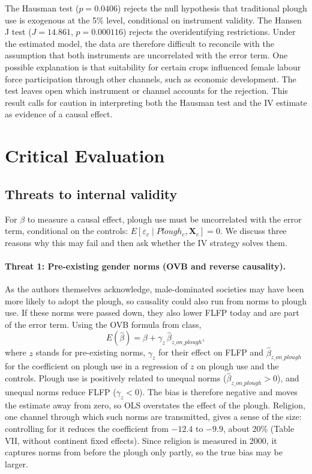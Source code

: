 \documentclass[12pt,a4paper]{article}
\begin{document}
The Hausman test ($p=0.0406$) rejects the null hypothesis that traditional plough use is exogenous at the 5\% level, conditional on instrument validity. The Hansen J test ($J=14.861$, $p=0.000116$) rejects the overidentifying restrictions. Under the estimated model, the data are therefore difficult to reconcile with the assumption that both instruments are uncorrelated with the error term. One possible explanation is that suitability for certain crops influenced female labour force participation through other channels, such as economic development. The test leaves open which instrument or channel accounts for the rejection. This result calls for caution in interpreting both the Hausman test and the IV estimate as evidence of a causal effect.

\section{Critical Evaluation}
\subsection{Threats to internal validity}

For $\beta$ to measure a causal effect, plough use must be uncorrelated with the error term, conditional on the controls: $E[\varepsilon_c \mid Plough_c, \mathbf{X}_c] = 0$. We discuss three reasons why this may fail and then ask whether the IV strategy solves them.

\paragraph{Threat 1: Pre-existing gender norms (OVB and reverse causality).}

As the authors themselves acknowledge, male-dominated societies may have been more likely to adopt the plough, so causality could also run from norms to plough use. If these norms were passed down, they also lower FLFP today and are part of the error term. Using the OVB formula from class,
\[
E(\hat\beta) = \beta + \gamma_z \, \hat\beta_{z\_on\_plough} ,
\]
where $z$ stands for pre-existing norms, $\gamma_z$ for their effect on FLFP and $\hat\beta_{z\_on\_plough}$ for the coefficient on plough use in a regression of $z$ on plough use and the controls. Plough use is positively related to unequal norms ($\hat\beta_{z\_on\_plough} > 0$), and unequal norms reduce FLFP ($\gamma_z < 0$). The bias is therefore negative and moves the estimate away from zero, so OLS overstates the effect of the plough. Religion, one channel through which such norms are transmitted, gives a sense of the size: controlling for it reduces the coefficient from $-12.4$ to $-9.9$, about 20\% (Table VII, without continent fixed effects). Since religion is measured in 2000, it captures norms from before the plough only partly, so the true bias may be larger.
\end{document}

